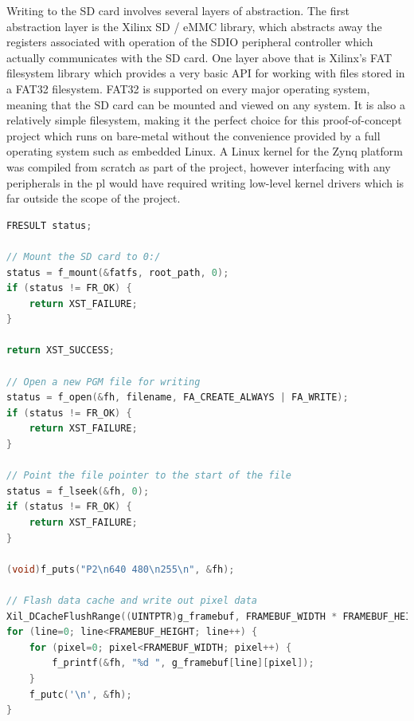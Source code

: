 Writing to the SD card involves several layers of abstraction. The first abstraction layer is the Xilinx SD / eMMC library, which abstracts away the registers associated with operation of the SDIO peripheral controller which actually communicates with the SD card. One layer above that is Xilinx's FAT filesystem library which provides a very basic API for working with files stored in a FAT32 filesystem. FAT32 is supported on every major operating system, meaning that the SD card can be mounted and viewed on any system. It is also a relatively simple filesystem, making it the perfect choice for this proof-of-concept project which runs on bare-metal without the convenience provided by a full operating system such as embedded Linux. A Linux kernel for the Zynq platform was compiled from scratch as part of the project, however interfacing with any peripherals in the \gls{pl} would have required writing low-level kernel drivers which is far outside the scope of the project.

\begin{lstlisting}[caption={Using the Xilffs library to write the framebuffer to an SD card.}, label={lst:xilffs}, language=C]
FRESULT status;

// Mount the SD card to 0:/
status = f_mount(&fatfs, root_path, 0);
if (status != FR_OK) {
    return XST_FAILURE;
}

return XST_SUCCESS;

// Open a new PGM file for writing
status = f_open(&fh, filename, FA_CREATE_ALWAYS | FA_WRITE);
if (status != FR_OK) {
    return XST_FAILURE;
}

// Point the file pointer to the start of the file
status = f_lseek(&fh, 0);
if (status != FR_OK) {
    return XST_FAILURE;
}

(void)f_puts("P2\n640 480\n255\n", &fh);

// Flash data cache and write out pixel data
Xil_DCacheFlushRange((UINTPTR)g_framebuf, FRAMEBUF_WIDTH * FRAMEBUF_HEIGHT);
for (line=0; line<FRAMEBUF_HEIGHT; line++) {
    for (pixel=0; pixel<FRAMEBUF_WIDTH; pixel++) {
        f_printf(&fh, "%d ", g_framebuf[line][pixel]);
    }
    f_putc('\n', &fh);
}
\end{lstlisting}

